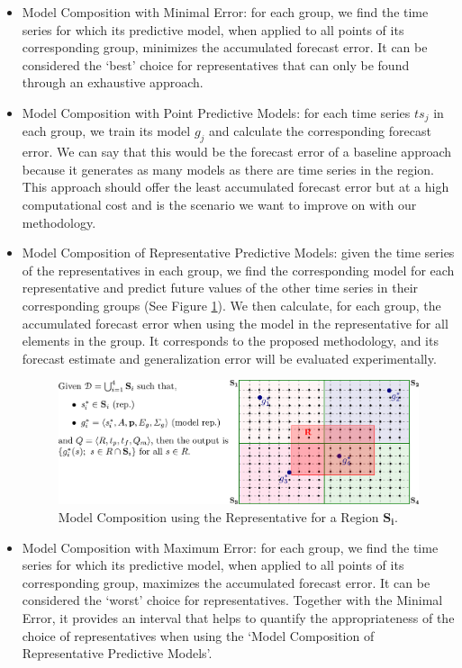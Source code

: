 \begin{itemize}%
	\item Model Composition with Minimal Error: for each group, we find the time series for which its predictive model, when applied to all points of its corresponding group, minimizes the accumulated forecast error. It can be considered the `best' choice for representatives that can only be found through an exhaustive approach.
	\item Model Composition with Point Predictive Models: for each time series $ts_j$ in each group, we train its model $g_j$ and calculate the corresponding forecast error. We can say that this would be the forecast error of a baseline approach because it generates as many models as there are time series in the region. This approach should offer the least accumulated forecast error but at a high computational cost and is the scenario we want to improve on with our methodology.
	\item Model Composition of Representative Predictive Models: given the time series of the representatives in each group, we find the corresponding model for each representative and predict future values of the other time series in their corresponding groups (See Figure \ref{Fig:ModelRegion}). We then calculate, for each group, the accumulated forecast error when using the model in the representative for all elements in the group. It corresponds to the proposed methodology, and its forecast estimate and generalization error will be evaluated experimentally. 
    
    \begin{figure}[!ht]
	    \centering
	    \includegraphics[scale=0.35]{../Figures/ModelComposition}
	    \caption{Model Composition using the Representative for a Region $\mathbf{S_{i}}$.}
	    \label{Fig:ModelRegion}
    \end{figure}

	\item Model Composition with Maximum Error: for each group, we find the time series for which its predictive model, when applied to all points of its corresponding group, maximizes the accumulated forecast error. It can be considered the `worst' choice for representatives. Together with the Minimal Error, it provides an interval that helps to quantify the appropriateness of the choice of representatives when using the `Model Composition of Representative Predictive Models'.
\end{itemize}

